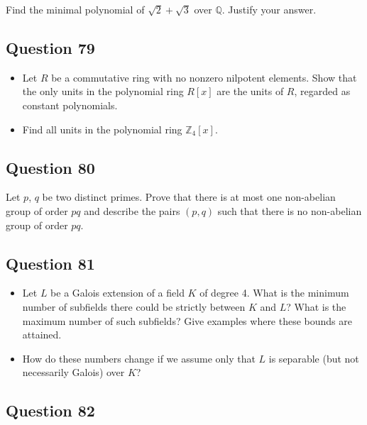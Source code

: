 \documentclass[12pt]{article}
\providecommand{\tightlist}{%
  \setlength{\itemsep}{0pt}\setlength{\parskip}{0pt}}
\begin{document}
Find the minimal polynomial of \(\sqrt2+\sqrt3\) over \(\mathbb Q\).
Justify your answer.

\hypertarget{question-79}{%
\subsection{Question 79}\label{question-79}}

\hfill

\begin{itemize}
\tightlist
\item
  Let \(R\) be a commutative ring with no nonzero nilpotent elements.
  Show that the only units in the polynomial ring \(R[x]\) are the units
  of \(R\), regarded as constant polynomials.
\item
  Find all units in the polynomial ring \(\mathbb Z_4[x]\).
\end{itemize}

\hypertarget{question-80}{%
\subsection{Question 80}\label{question-80}}

Let \(p\), \(q\) be two distinct primes. Prove that there is at most one
non-abelian group of order \(pq\) and describe the pairs \((p,q)\) such
that there is no non-abelian group of order \(pq\).

\hypertarget{question-81}{%
\subsection{Question 81}\label{question-81}}

\begin{itemize}
\tightlist
\item
  Let \(L\) be a Galois extension of a field \(K\) of degree 4. What is
  the minimum number of subfields there could be strictly between \(K\)
  and \(L\)? What is the maximum number of such subfields? Give examples
  where these bounds are attained.
\item
  How do these numbers change if we assume only that \(L\) is separable
  (but not necessarily Galois) over \(K\)?
\end{itemize}

\hypertarget{question-82}{%
\subsection{Question 82}\label{question-82}}
\end{document}
